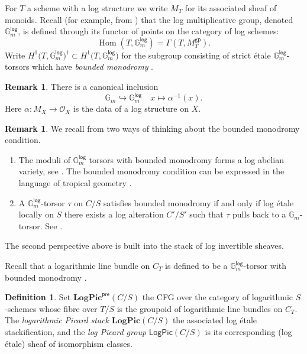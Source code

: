 \documentclass[11pt]{amsart}
\theoremstyle{definition}
\theoremstyle{definition}
\newtheorem{remark}[theorem]{Remark}
\newtheorem{definition}[theorem]{Definition}
\begin{document}
For $T$ a scheme with a log structure we write $M_T$ for its associated sheaf of monoids. Recall (for example, from \cite[Definition~2.2.7.1]{MolchoWise}) that the log multiplicative group, denoted $\mathbb{G}_m^\mathsf{log}$, is defined through its functor of points on the category of log schemes: $$\operatorname{Hom}(T,\mathbb{G}_m^\mathsf{log}) = \Gamma(T,M_T^\mathsf{gp}).$$
Write $H^1\bigl(T, \mathbb{G}_m^\mathsf{log}\bigr)^{\dagger}\subset H^1\bigl(T, \mathbb{G}_m^\mathsf{log}\bigr)$ for the subgroup consisting of strict \'etale $\mathbb{G}_m^\mathsf{log}$-torsors which have \textit{bounded monodromy} \cite[Section 3.5]{MolchoWise}.

\begin{remark}
    There is a canonical inclusion $$\mathbb{G}_m \hookrightarrow \mathbb{G}_m^\mathsf{log} \quad x\mapsto \alpha^{-1}(x).$$
    Here $\alpha \colon M_X\rightarrow \mathcal{O}_X$ is the data of a log structure on $X$.
\end{remark}

\begin{remark}\label{remark: bounded monodromy}
We recall from \cite{MolchoWise} two ways of thinking about the bounded monodromy condition.
\begin{enumerate}
    \item The moduli of $\mathbb{G}_m^\mathsf{log}$ torsors with bounded monodromy forms a log abelian variety, see \cite[Example 3.6.4]{MolchoWise}. The bounded monodromy condition can be expressed in the language of tropical geometry \cite[Definition 3.5.3]{MolchoWise}.
    \item\label{item: M1 to log Pic is surjective kind of} A $\mathbb{G}_m^\mathsf{log}$-torsor $\tau$ on $C/S$ satisfies bounded monodromy if and only if log \'etale locally on $S$ there exists a log alteration $C'/S'$ such that $\tau$ pulls back to a $\mathbb{G}_m$-torsor. See \cite[Corollary~4.3.1]{MolchoWise}.
\end{enumerate}
The second perspective above is built into the stack of log invertible sheaves.
\end{remark}
Recall that a logarithmic line bundle on $C_T$ is defined to be a $\mathbb{G}_m^\mathsf{log}$-torsor with bounded monodromy \cite{MolchoWise}.
\begin{definition}
    Set $\mathbf{LogPic}^\mathsf{pre}({C/S})$ the CFG over the category of logarithmic $S$-schemes whose fibre over $T/ S$ is the groupoid of logarithmic line bundles on $C_T$. The \textit{logarithmic Picard stack} $\mathbf{LogPic}({C/S})$ the associated log \'etale stackification, and the \textit{log Picard group} $\mathsf{LogPic}(C/S)$ is its corresponding (log \'etale) sheaf of isomorphism classes.
\end{definition}
\end{document}
